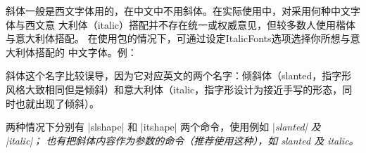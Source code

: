 
斜体一般是西文字体用的，在中文中不用斜体。在实际使用中，对采用何种中文字体与西文意
大利体（italic）搭配并不存在统一或权威意见，但较多数人使用楷体与意大利体搭配。
在使用包的情况下，可通过设定ItalicFonts选项选择你所想与意大利体搭配的
中文字体。例：
\begin{texlist}
\end{texlist}

斜体这个名字比较误导，因为它对应英文的两个名字：倾斜体（slanted，指字形风格大致相同但是倾斜）和意大利体（italic，指字形设计为接近手写的形态，同时也就出现了倾斜）。

两种情况下分别有 |slshape| 和 |itshape| 两个命令，使用例如 |\slshape slanted| 及 |\itshape italic|；
也有把斜体内容作为参数的命令（推荐使用这种），如 \textsl{slanted} 及 \textit{italic}。



